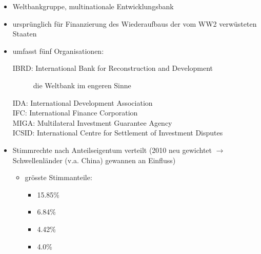 \begin{itemize}
	\item Weltbankgruppe, multinationale Entwicklungsbank
	\item ursprünglich für Finanzierung des Wiederaufbaus der vom WW2 verwüsteten Staaten
	\item umfasst fünf Organisationen:
	\begin{description}
		\item[IBRD: International Bank for Reconstruction and Development] die Weltbank im engeren Sinne
		\item[IDA: International Development Association]
		\item[IFC: International Finance Corporation]
		\item[MIGA: Multilateral Investment Guarantee Agency]
		\item[ICSID: International Centre for Settlement of Investment Disputes]
	\end{description}
	\item Stimmrechte nach Anteilseigentum verteilt (2010 neu gewichtet $\rightarrow$ Schwellenländer (v.a. China) gewannen an Einfluss)
	\begin{itemize}
		\item grösste Stimmanteile:
		\begin{itemize}
			\item{} 15.85\%
			\item{} 6.84\%
			\item{} 4.42\%
			\item{} 4.0\%
		\end{itemize}
	\end{itemize}
\end{itemize}
\vspace{\baselineskip}
